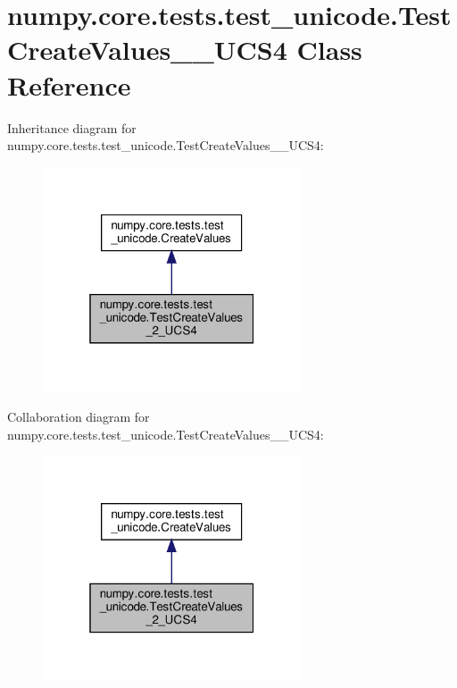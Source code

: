 \hypertarget{classnumpy_1_1core_1_1tests_1_1test__unicode_1_1TestCreateValues__2__UCS4}{}\section{numpy.\+core.\+tests.\+test\+\_\+unicode.\+Test\+Create\+Values\+\_\+\_\+\+U\+C\+S4 Class Reference}
\label{classnumpy_1_1core_1_1tests_1_1test__unicode_1_1TestCreateValues__2__UCS4}


Inheritance diagram for numpy.\+core.\+tests.\+test\+\_\+unicode.\+Test\+Create\+Values\+\_\+\_\+\+U\+C\+S4\+:
\nopagebreak
\begin{figure}[H]
\begin{center}
\leavevmode
\includegraphics[width=217pt]{classnumpy_1_1core_1_1tests_1_1test__unicode_1_1TestCreateValues__2__UCS4__inherit__graph}
\end{center}
\end{figure}


Collaboration diagram for numpy.\+core.\+tests.\+test\+\_\+unicode.\+Test\+Create\+Values\+\_\+\_\+\+U\+C\+S4\+:
\nopagebreak
\begin{figure}[H]
\begin{center}
\leavevmode
\includegraphics[width=217pt]{classnumpy_1_1core_1_1tests_1_1test__unicode_1_1TestCreateValues__2__UCS4__coll__graph}
\end{center}
\end{figure}
